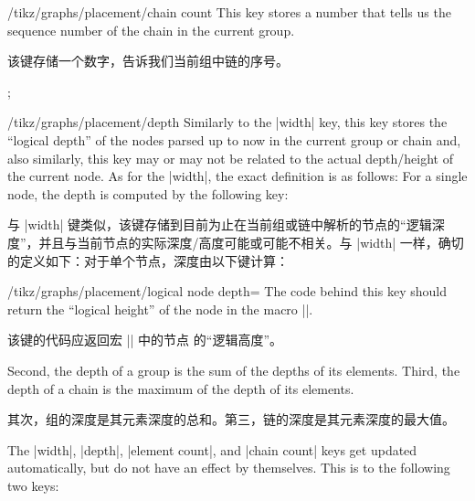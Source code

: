 \begin{key}{/tikz/graphs/placement/chain count}
    This key stores a number that tells us the sequence number of the
    chain in the current group.
    
    该键存储一个数字，告诉我们当前组中链的序号。
\begin{codeexample}[preamble={\usetikzlibrary{graphs}}]
\tikz {};
\end{codeexample}
\end{key}

\begin{key}{/tikz/graphs/placement/depth}
    Similarly to the |width| key, this key stores the ``logical depth'' of the
    nodes parsed up to now in the current group or chain and, also similarly,
    this key may or may not be related to the actual depth/height of the
    current node. As for the |width|, the exact definition is as follows: For a
    single node, the depth is computed by the following key:
    
    与 |width| 键类似，该键存储到目前为止在当前组或链中解析的节点的“逻辑深度”，并且与当前节点的实际深度/高度可能或可能不相关。与 |width| 一样，确切的定义如下：对于单个节点，深度由以下键计算：    
    \begin{key}{/tikz/graphs/placement/logical node depth=}
        The code behind this key should return the ``logical height'' of the
        node  in the macro |\pgfmathresult|.

        该键的代码应返回宏 |\pgfmathresult| 中的节点  的“逻辑高度”。
      \end{key}
    Second, the depth of a group is the sum of the depths of its elements.
    Third, the depth of a chain is the maximum of the depth of its elements.

    其次，组的深度是其元素深度的总和。第三，链的深度是其元素深度的最大值。
\end{key}

The |width|, |depth|, |element count|, and |chain count| keys get updated
automatically, but do not have an effect by themselves. This is to the
following two keys:

